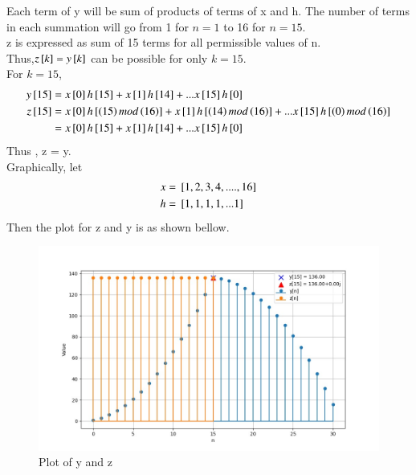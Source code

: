 \documentclass[journal,12pt,twocolumn]{IEEEtran}
\theoremstyle{remark}
\begin{document}
Each term of y will be sum of products of terms of x and h. The number of terms in each summation will go from 1 for $n=1$ to 16 for $n=15$. \\
z is expressed as sum of 15 terms for all permissible values of n.
\\ Thus,$z{}\left[k\right] = y{}\left[k\right]$ can be possible for only $k=15$.
\\ For $k = 15$,
\begin{align}
    y{}\left[15\right] &= x{}\left[0\right]h{}\left[15\right] +  x{}\left[1\right]h{}\left[14\right] + ...  x{}\left[15\right]h{}\left[0\right] \\
    z{}\left[15\right] &= x{}\left[0\right] h{}\left[\left(15\right)mod\left(16\right)\right] + x{}\left[1\right] h{}\left[\left(14\right)mod\left(16\right)\right] + ... x{}\left[15\right] h{}\left[\left(0\right)mod\left(16\right)\right]\\
    &=  x{}\left[0\right]h{}\left[15\right] +  x{}\left[1\right]h{}\left[14\right] + ...  x{}\left[15\right]h{}\left[0\right] 
\end{align}
Thus , z = y.\\
Graphically, let 
\begin{align}
    x &= {}\left[1,2,3,4,....,16\right]\\
    h &= {}\left[1,1,1,1, ... 1\right]
\end{align}
Then the plot for z and y is as shown bellow.
\begin{figure}[!ht]
\centering
\begin{center}
\includegraphics[width=\columnwidth]{Figure_1}
\end{center}
\caption{Plot of y and z}
\end{figure}
\end{document}
